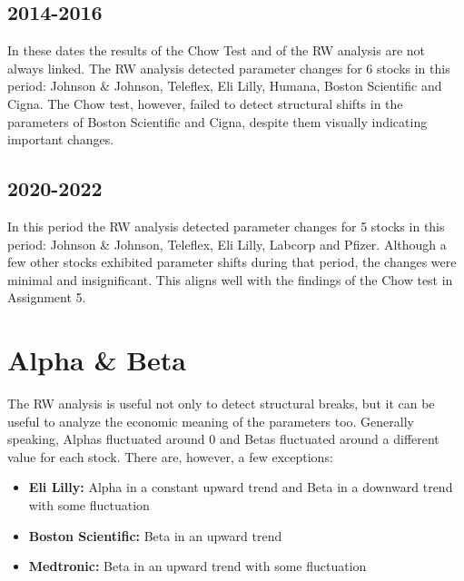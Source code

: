 
\subsection{2014-2016}

In these dates the results of the Chow Test and of the RW analysis are not always linked. 
The RW analysis detected parameter changes for 6 stocks in this period: Johnson \& Johnson, Teleflex, Eli Lilly, Humana,
Boston Scientific and Cigna.
The Chow test, however, failed to detect structural shifts in the parameters of Boston Scientific and Cigna, despite them 
visually indicating important changes.


\subsection{2020-2022}

In this period the RW analysis detected parameter changes for 5 stocks in this period: Johnson \& Johnson, Teleflex, Eli Lilly, 
Labcorp and Pfizer.
Although a few other stocks exhibited parameter shifts during that period, the changes were minimal and insignificant. 
This aligns well with the findings of the Chow test in Assignment 5.

\section{Alpha \& Beta}

The RW analysis is useful not only to detect structural breaks, but it can be useful to analyze the economic meaning of the
parameters too.
Generally speaking, Alphas fluctuated around 0 and Betas fluctuated around a different value for each stock.
There are, however, a few exceptions:
\begin{itemize}
    \item \textbf{Eli Lilly:} Alpha in a constant upward trend and Beta in a downward trend with some fluctuation
    \item \textbf{Boston Scientific:} Beta in an upward trend
    \item \textbf{Medtronic:} Beta in an upward trend with some fluctuation
\end{itemize}

